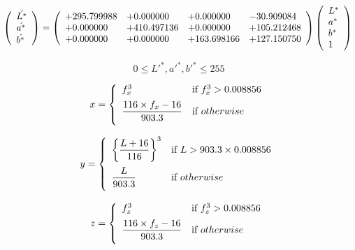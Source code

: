 \documentclass{article}
\begin{document}
\[ \left( \begin{array}{l} \acute{L^{*}} \\ \acute{a^{*}} \\ \acute{b^{*}} \\ \end{array} \right) = \left( \begin{array}{llll} +295.799988 & +0.000000 & +0.000000 & -30.909084 \\ +0.000000 & +410.497136 & +0.000000 & +105.212468 \\ +0.000000 & +0.000000 & +163.698166 & +127.150750 \\ \end{array} \right) \left( \begin{array}{l} L^{*} \\ a^{*} \\ b^{*} \\ 1 \\ \end{array} \right) \\ \]
\pagebreak

\[ 0 \le L'^{*},a'^{*},b'^{*} \le 255 \]
\pagebreak

\[ x=\left \{ \begin{array}{ll} f_{x}^{3} & \mbox{if}\ f_{x}^{3} > 0.008856 \vspace{.5em} \\ \dfrac{116\times f_{x} - 16}{903.3} & \mbox{if}\ otherwise \vspace{.5em} \\ \end{array} \right. \]
\pagebreak

\[ y=\left \{ \begin{array}{ll} \left\{\dfrac{L + 16}{116}\right\}^{3} & \mbox{if}\ L > 903.3\times 0.008856 \vspace{.5em} \\ \dfrac{L}{903.3} & \mbox{if}\ otherwise \vspace{.5em} \\ \end{array} \right. \]
\pagebreak

\[ z=\left \{ \begin{array}{ll} f_{z}^{3} & \mbox{if}\ f_{z}^{3} > 0.008856 \vspace{.5em} \\ \dfrac{116\times f_{z} - 16}{903.3} & \mbox{if}\ otherwise \vspace{.5em} \\ \end{array} \right. \]
\pagebreak
\end{document}
